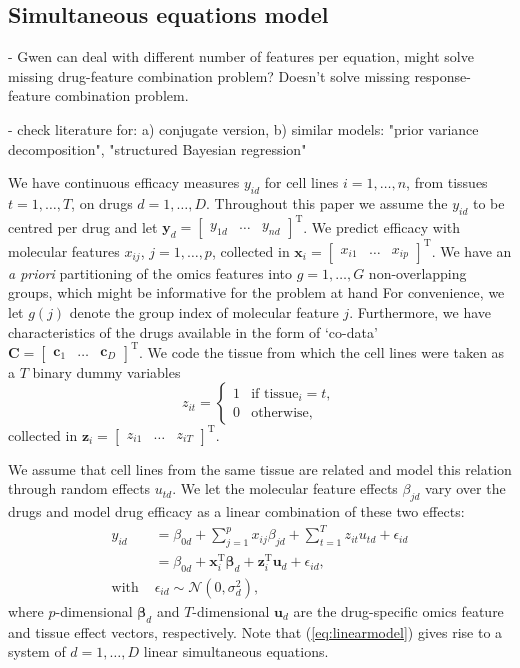 \documentclass[a4paper,hidelinks]{article}\usepackage[]{graphicx}\usepackage[]{color}
\newcommand{\bbeta}{\bm{\beta}}
\newcommand{\y}{\mathbf{y}}
\newcommand{\x}{\mathbf{x}}
\newcommand{\0}{\bm{0}}
\newcommand{\tr}{^{\text{T}}}
\renewcommand{\(}{\left(}
\renewcommand{\)}{\right)}
\renewcommand{\[}{\left[}
\renewcommand{\]}{\right]}
\begin{document}
	\subsection{Simultaneous equations model}\label{sec:SEM}
	- Gwen can deal with different number of features per equation, might solve missing drug-feature combination problem? Doesn't solve missing response-feature combination problem.
	
	- check literature for: a) conjugate version, b) similar models: "prior variance decomposition", "structured Bayesian regression"
	
	We have continuous efficacy measures $y_{id}$ for cell lines $i=1,\dots, n$, from tissues $t=1, \dots, T$, on drugs $d=1,\dots,D$. Throughout this paper we assume the $y_{id}$ to be centred per drug and let $\y_d = \begin{bmatrix} y_{1d} & \dots & y_{nd} \end{bmatrix} \tr$. We predict efficacy with molecular features $x_{ij}$, $j=1,\dots, p$, collected in $\x_i = \begin{bmatrix} x_{i1} & \dots & x_{ip} \end{bmatrix} \tr$. We have an \textit{a priori} partitioning of the omics features into $g=1, \dots, G$ non-overlapping groups, which might be informative for the problem at hand For convenience, we let $g(j)$ denote the group index of molecular feature $j$. Furthermore, we have characteristics of the drugs available in the form of `co-data' $\mathbf{C} = \begin{bmatrix} \mathbf{c}_1 & \dots & \mathbf{c}_D \end{bmatrix} \tr$. We code the tissue from which the cell lines were taken as a $T$ binary dummy variables 
	$$
	z_{it} = \begin{cases}
	1 & \text{if } \text{tissue}_i = t, \\
	0 & \text{otherwise},
	\end{cases}
	$$
	collected in $\mathbf{z}_i = \begin{bmatrix} z_{i1} & \dots & z_{iT} \end{bmatrix} \tr$.
	
	We assume that cell lines from the same tissue are related and model this relation through random effects $u_{td}$. We let the molecular feature effects $\beta_{jd}$ vary over the drugs and model drug efficacy as a linear combination of these two effects:
	\begin{subequations}\label{eq:linearmodel}
		\begin{align}
		y_{id} & = \beta_{0d} + \sum_{j=1}^p x_{ij} \beta_{jd} + \sum_{t=1}^T z_{it} u_{td} + \epsilon_{id} \\
		& = \beta_{0d} + \x_i \tr \bbeta_d + \mathbf{z}_i \tr \mathbf{u}_d + \epsilon_{id},\\
		\text{with } & \epsilon_{id} \sim \mathcal{N}(0, \sigma_d^2),
		\end{align}
	\end{subequations}
	where $p$-dimensional $\bbeta_d$ and $T$-dimensional $\bm{u}_d$ are the drug-specific omics feature and tissue effect vectors, respectively. Note that (\ref{eq:linearmodel}) gives rise to a system of $d=1, \dots, D$ linear simultaneous equations.
	
\end{document}
